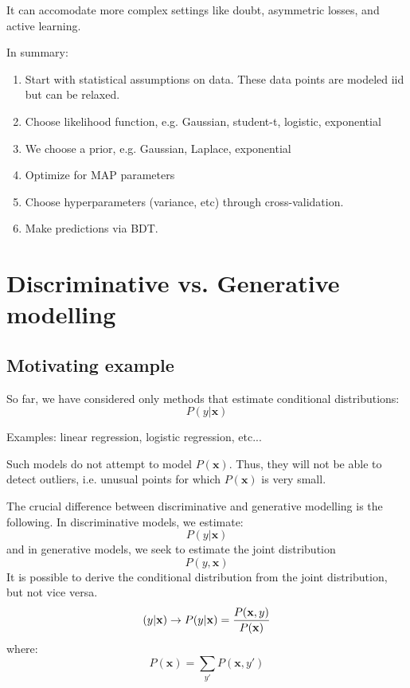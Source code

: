 \documentclass[a4paper,10pt,twoside]{article}
\begin{document}
It can accomodate more complex settings like doubt, asymmetric losses, and active learning.

In summary:
\begin{enumerate}
\item Start with statistical assumptions on data. These data points are modeled iid but can be relaxed.
\item Choose likelihood function, e.g. Gaussian, student-t, logistic, exponential
\item We choose a prior, e.g. Gaussian, Laplace, exponential
\item Optimize for MAP parameters
\item Choose hyperparameters (variance, etc) through cross-validation.
\item Make predictions via BDT.
\end{enumerate}

\section{Discriminative vs. Generative modelling}

\subsection{Motivating example}

So far, we have considered only methods that estimate conditional distributions:
\begin{equation*}
  P(y|\mathbf{x})
\end{equation*}

Examples: linear regression, logistic regression, etc...

Such models do not attempt to model $P(\mathbf{x})$. Thus, they will not be able to detect outliers, i.e. unusual points for which $P(\mathbf{x})$ is very small.

The crucial difference between discriminative and generative modelling is the following. In discriminative models, we estimate:
\begin{equation*}
  P(y|\mathbf{x})
\end{equation*}
and in generative models, we seek to estimate the joint distribution
\begin{equation*}
  P(y,\mathbf{x})
\end{equation*}
It is possible to derive the conditional distribution from the joint distribution, but not vice versa.
\begin{equation*}
  (y|\mathbf{x}) \rightarrow P(y|\mathbf{x})={P(\mathbf{x}, y)\over P(\mathbf{x})}
\end{equation*}
where:
\begin{equation*}
  P(\mathbf{x}) = \sum_{y'}P(\mathbf{x}, y')
\end{equation*}
\end{document}
